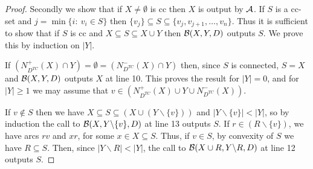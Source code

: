 \documentclass[11pt]{article}
\newcommand{\2}{\vspace{0.2 cm}}
\begin{document}
\begin{proof}
Secondly we show that if $X\not=\emptyset$ is cc then $X$ is output
by $\cal A$.
If $S$ is a cc-set and $j=\min\{i:\ v_i\in S\}$ then $\{v_j\}
\subseteq S\subseteq \{v_j,v_{j+1}, \ldots, v_{n} \}$. Thus it is
sufficient to show that if $S$ is cc and $X \subseteq S \subseteq X
\cup Y$ then ${\cal B}(X,Y,D)$ outputs $S$. We prove this by
induction on $|Y|$.

If $(N^+_{D^{TC}}(X)\cap Y)
=\emptyset=(N^-_{D^{TC}}(X)\cap Y)$ then, since $S$ is connected,
$S=X$ and ${\cal B}(X,Y,D)$ outputs $X$ at line 10. This proves the
result for $|Y|=0$, and for $|Y|\geq 1$ we may assume that $v\in
(N^+_{D^{TC}}(X)\cup Y \cup N^-_{D^{TC}}(X))$.

If $v\not\in S$ then we have $X\subseteq
S\subseteq(X\cup(Y\backslash\{v\}))$ and $|Y\backslash\{v\}|<|Y|$, so
by induction the call to ${\cal B}(X,Y\backslash\{v\},D)$ at line 13
outputs $S$. If $r\in (R\backslash\{v\})$, we have arcs $rv$ and
$xr$, for some $x\in X\subseteq S$. Thus, if $v\in S$, by convexity
of $S$ we have $R\subseteq S$. Then, since $|Y\backslash R|<|Y|$,
the call to ${\cal B}(X\cup R,Y\backslash R,D)$ at line 12 outputs
$S$.
\end{proof}
\end{document}

